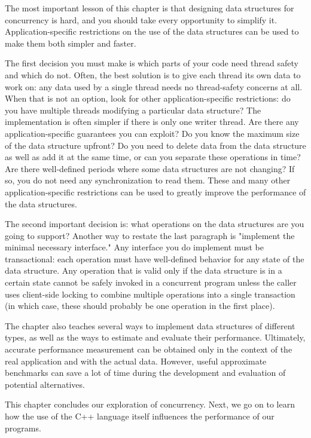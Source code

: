 The most important lesson of this chapter is that designing data structures for concurrency is hard, and you should take every opportunity to simplify it. Application-specific restrictions on the use of the data structures can be used to make them both simpler and faster. 

The first decision you must make is which parts of your code need thread safety and which do not. Often, the best solution is to give each thread its own data to work on: any data used by a single thread needs no thread-safety concerns at all. When that is not an option, look for other application-specific restrictions: do you have multiple threads modifying a particular data structure? The implementation is often simpler if there is only one writer thread. Are there any application-specific guarantees you can exploit? Do you know the maximum size of the data structure upfront? Do you need to delete data from the data structure as well as add it at the same time, or can you separate these operations in time? Are there well-defined periods where some data structures are not changing? If so, you do not need any synchronization to read them. These and many other application-specific restrictions can be used to greatly improve the performance of the data structures. 

The second important decision is: what operations on the data structures are you going to support? Another way to restate the last paragraph is "implement the minimal necessary interface." Any interface you do implement must be transactional: each operation must have well-defined behavior for any state of the data structure. Any operation that is valid only if the data structure is in a certain state cannot be safely invoked in a concurrent program unless the caller uses client-side locking to combine multiple operations into a single transaction (in which case, these should probably be one operation in the first place).

The chapter also teaches several ways to implement data structures of different types, as well as the ways to estimate and evaluate their performance. Ultimately, accurate performance measurement can be obtained only in the context of the real application and with the actual data. However, useful approximate benchmarks can save a lot of time during the development and evaluation of potential alternatives. 

This chapter concludes our exploration of concurrency. Next, we go on to learn how the use of the C++ language itself influences the performance of our programs.